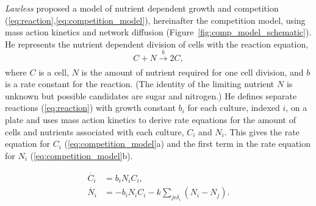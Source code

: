 \textit{Lawless} proposed a model of nutrient dependent growth and
competition (\ref{eq:reaction},\ref{eq:competition_model}),
hereinafter the competition model, using mass action kinetics and
network diffusion (Figure~\ref{fig:comp_model_schematic}). He
represents the nutrient dependent division of cells with the reaction
equation,
\begin{equation}
  \label{eq:reaction}
    C + N \xrightarrow[]{b} 2C,
\end{equation}
where \(C\) is a cell, \(N\) is the amount of nutrient required for
one cell division, and \(b\) is a rate constant for the reaction. (The
identity of the limiting nutrient \(N\) is unknown but possible
candidates are sugar and nitrogen.) He defines separate reactions
(\ref{eq:reaction}) with growth constant \(b_{i}\) for each culture,
indexed \(i\), on a plate and uses mass action kinetics to derive rate
equations for the amount of cells and nutrients associated with each
culture, \(C_{i}\) and \(N_{i}\). This gives the rate equation for
\(C_{i}\) (\ref{eq:competition_model}a) and the first term in the rate
equation for \(N_{i}\) (\ref{eq:competition_model}b).

\begin{subequations}
  \label{eq:competition_model}
  \begin{align}
         \dot{C_{i}}& = b_{i}N_{i}C_{i},\\
         \dot{N_{i}}& = - b_{i}N_{i}C_{i} - k\sum_{j \epsilon \delta_i}(N_{i} - N_{j}).
  \end{align}
\end{subequations}


